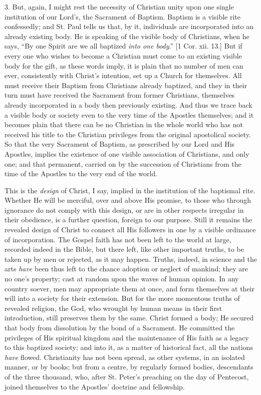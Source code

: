 3. But, again, I might rest the necessity of Christian unity upon
one single institution of our Lord's, the Sacrament of Baptism.
Baptism is a visible rite confessedly; and St. Paul tells us that, by
it, individuals are incorporated into an already existing body. He is
speaking of the visible body of Christians, when he says, ``By one
Spirit are we all baptized \emph{into one body}.'' [1 Cor. xii.
13.] But if every one who wishes to become a Christian must come to an
existing visible body for the gift, as these words imply, it is plain
that no number of men can ever, consistently with Christ's intention,
set up a Church for themselves. All must receive their Baptism from
Christians already baptized, and they in their turn must have received
the Sacrament from former Christians, themselves already incorporated
in a body then previously existing. And thus we trace back a visible
body or society even to the very time of the Apostles themselves; and
it becomes plain that there can be no Christian in the whole world who
has not received his title to the Christian privileges from the
original apostolical society. So that the very Sacrament of Baptism,
as prescribed by our Lord and His Apostles, implies the existence of
one visible association of Christians, and only one; and that
permanent, carried on by the succession of Christians from the time of
the Apostles to the very end of the world.

This is the \emph{design} of Christ, I say, implied in the
institution of the baptismal rite. Whether He will be merciful, over
and above His promise, to those who through ignorance do not comply
with this design, or are in other respects irregular in their
obedience, is a further question, foreign to our purpose. Still it
remains the revealed design of Christ to connect all His followers in
one by a visible ordinance of incorporation. The Gospel faith has not
been left to the world at large, recorded indeed in the Bible, but
there left, like other important truths, to be taken up by men or
rejected, as it may happen. Truths, indeed, in science and the arts \emph{have}
been thus left to the chance adoption or neglect of mankind; they are
no one's property; cast at random upon the waves of human opinion. In
any country soever, men may appropriate them at once, and form
themselves at their will into a society for their extension. But for
the more momentous truths of revealed religion, the God, who wrought
by human means in their first introduction, still preserves them by
the same. Christ formed a body; He secured that body from dissolution
by the bond of a Sacrament. He committed the privileges of His
spiritual kingdom and the maintenance of His faith as a legacy to this
baptized society; and into it, as a matter of historical fact, all the
nations \emph{have} flowed. Christianity has not been spread, as other
systems, in an isolated manner, or by books; but from a centre, by
regularly formed bodies, descendants of the three thousand, who, after
St. Peter's preaching on the day of Pentecost, joined themselves to
the Apostles' doctrine and fellowship.

